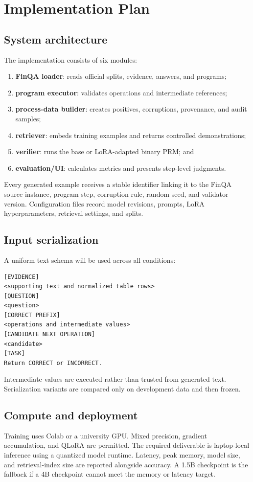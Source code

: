 \documentclass[10pt,twocolumn]{article}
\begin{document}
\section{Implementation Plan}
\subsection{System architecture}
The implementation consists of six modules:
\begin{enumerate}
  \item \textbf{FinQA loader}: reads official splits, evidence, answers, and programs;
  \item \textbf{program executor}: validates operations and intermediate references;
  \item \textbf{process-data builder}: creates positives, corruptions, provenance, and audit samples;
  \item \textbf{retriever}: embeds training examples and returns controlled demonstrations;
  \item \textbf{verifier}: runs the base or LoRA-adapted binary PRM; and
  \item \textbf{evaluation/UI}: calculates metrics and presents step-level judgments.
\end{enumerate}

Every generated example receives a stable identifier linking it to the FinQA source instance, program step, corruption rule, random seed, and validator version. Configuration files record model revisions, prompts, LoRA hyperparameters, retrieval settings, and splits.

\subsection{Input serialization}
A uniform text schema will be used across all conditions:
\begin{lstlisting}[style=compact]
[EVIDENCE]
<supporting text and normalized table rows>
[QUESTION]
<question>
[CORRECT PREFIX]
<operations and intermediate values>
[CANDIDATE NEXT OPERATION]
<candidate>
[TASK]
Return CORRECT or INCORRECT.
\end{lstlisting}
Intermediate values are executed rather than trusted from generated text. Serialization variants are compared only on development data and then frozen.

\subsection{Compute and deployment}
Training uses Colab or a university GPU. Mixed precision, gradient accumulation, and QLoRA are permitted. The required deliverable is laptop-local inference using a quantized model runtime. Latency, peak memory, model size, and retrieval-index size are reported alongside accuracy. A 1.5B checkpoint is the fallback if a 4B checkpoint cannot meet the memory or latency target.
\end{document}
